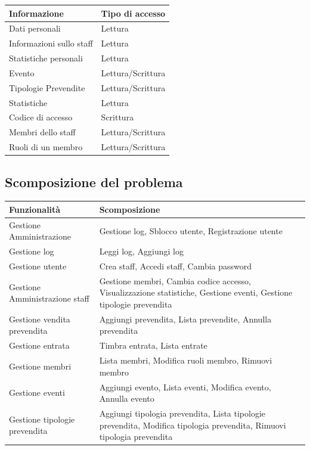 \documentclass[a4paper]{article}
\begin{document}
\begin{center}
    \begin{tabularx}{1\textwidth}{|X|X|}
    \hline
    \textbf{Informazione} & \textbf{Tipo di accesso} \\
    \hline
    \hline
    Dati personali & Lettura\\
    \hline
    Informazioni sullo staff & Lettura\\
    \hline
    Statistiche personali & Lettura\\
    \hline
    Evento & Lettura/Scrittura\\
    \hline
    Tipologie Prevendite & Lettura/Scrittura\\
    \hline
    Statistiche & Lettura\\
    \hline
    Codice di accesso & Scrittura\\
    \hline
    Membri dello staff & Lettura/Scrittura\\
    \hline
    Ruoli di un membro & Lettura/Scrittura\\
    \hline
    \end{tabularx}
\end{center}

\newpage

\subsection{Scomposizione del problema}

\begin{center}
    \begin{tabularx}{1\textwidth}{|X|X|}
    \hline
    \textbf{Funzionalità} & \textbf{Scomposizione} \\
    \hline
    \hline
    Gestione Amministrazione & Gestione log, Sblocco utente, Registrazione utente\\
    \hline
    Gestione log & Leggi log, Aggiungi log\\
    \hline
    Gestione utente & Crea staff, Accedi staff, Cambia password\\
    \hline
    Gestione Amministrazione staff & Gestione membri, Cambia codice accesso, Visualizzazione statistiche, Gestione eventi, Gestione tipologie prevendita\\
    \hline
    Gestione vendita prevendita & Aggiungi prevendita, Lista prevendite, Annulla prevendita\\
    \hline
    Gestione entrata & Timbra entrata, Lista entrate\\
    \hline
    Gestione membri & Lista membri, Modifica ruoli membro, Rimuovi membro\\
    \hline
    Gestione eventi & Aggiungi evento, Lista eventi, Modifica evento, Annulla evento\\
    \hline
    Gestione tipologie prevendita & Aggiungi tipologia prevendita, Lista tipologie prevendita, Modifica tipologia prevendita, Rimuovi tipologia prevendita\\
    \hline
    \end{tabularx}
\end{center}
\end{document}
